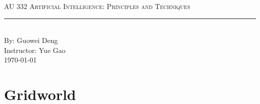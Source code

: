 \documentclass[aps,letterpaper,10pt]{revtex4}
\newcommand{\labtitle}{AU 332 Artificial Intelligence: Principles and Techniques}
\newcommand{\authorname}{Guowei Deng}
\newcommand{\professor}{Yue Gao}
\begin{document}
\begin{titlepage}
\begin{center}
{\Large \textsc{\labtitle} \\ \vspace{4pt}}
\rule[13pt]{\textwidth}{1pt} \\ \vspace{150pt}
{\large By: \authorname \\ \vspace{10pt}
Instructor: \professor \\ \vspace{10pt}
\today}
\end{center}
\end{titlepage}
\section{Gridworld}
\end{document}
